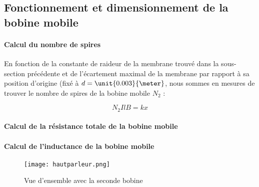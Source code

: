 \subsection{Fonctionnement et dimensionnement de la bobine mobile}

\paragraph{Calcul du nombre de spires}
En fonction de la constante de raideur de la membrane trouvé dans la sous-section précédente et de l'écartement
maximal de la membrane par rapport à sa position d'origine (fixé à $d = \unit{0.003}{\meter}$, nous sommes en
mesures de trouver le nombre de spires de la bobine mobile $N_2$ :

$$N_2IlB = kx$$

\paragraph{Calcul de la résistance totale de la bobine mobile}

\paragraph{Calcul de l'inductance de la bobine mobile}

\begin{figure}[h]
\centering
\texttt{[image: hautparleur.png]}
\caption{Vue d'ensemble avec la seconde bobine}
\label{Vue d'ensemble avec la seconde bobine}
\end{figure}

